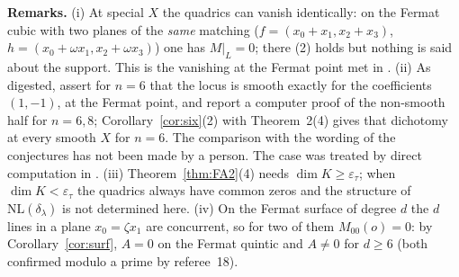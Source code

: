 \documentclass[11pt]{article}
\numberwithin{equation}{section}
\theoremstyle{remark}
\newcommand{\NL}{\mathrm{NL}}
\newcommand{\et}{\varepsilon_\tau}
\newcommand{\run}[1]{\medskip\noindent\textbf{#1}}
\begin{document}
\run{Remarks.} (i) At special $X$ the quadrics can vanish identically: on the Fermat cubic with two planes of the
\emph{same} matching ($f=(x_0+x_1,x_2+x_3)$, $h=(x_0+\omega x_1,x_2+\omega x_3)$) one has $M|_L=0$; there (2) holds
but nothing is said about the support. This is the vanishing at the Fermat point met in \cite{P1,P2}.
(ii) As digested, \cite[Conj.~6, 7]{Mo} assert for $n=6$ that the locus is smooth exactly for the coefficients
$(1,-1)$, at the Fermat point, and report a computer proof of the non-smooth half for $n=6,8$;
Corollary~\ref{cor:six}(2) with Theorem~2(4) gives that dichotomy at every smooth $X$ for $n=6$. The comparison
with the wording of the conjectures has not been made by a person. The case was treated by direct computation
in \cite{P1}. (iii) Theorem~\ref{thm:FA2}(4) needs $\dim K\ge\et$; when $\dim K<\et$ the quadrics always have
common zeros and the structure of $\NL(\delta_\lambda)$ is not determined here. (iv) On the Fermat surface of
degree $d$ the $d$ lines in a plane $x_0=\zeta x_1$ are concurrent, so for two of them $M_{00}(o)=0$: by
Corollary~\ref{cor:surf}, $A=0$ on the Fermat quintic and $A\ne0$ for $d\ge6$ (both confirmed modulo a prime by
referee~18).
\end{document}
